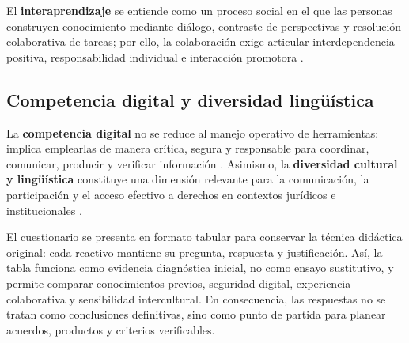 \documentclass[
  spanish,
  letterpaper, oneside
]{article}
\begin{document}
El \textbf{interaprendizaje} se entiende como un proceso social en el que las
personas construyen conocimiento mediante diálogo, contraste de perspectivas y
resolución colaborativa de tareas; por ello, la colaboración exige articular
interdependencia positiva, responsabilidad individual e interacción promotora
\citep{vygotsky1978mind,johnsonJohnson1999learning}.

\subsection{Competencia digital y diversidad lingüística}

La \textbf{competencia digital} no se reduce al manejo operativo de herramientas:
implica emplearlas de manera crítica, segura y responsable para coordinar,
comunicar, producir y verificar información \citep{unescoDigitalLiteracy2018}.
Asimismo, la \textbf{diversidad cultural y lingüística} constituye una dimensión
relevante para la comunicación, la participación y el acceso efectivo a derechos
en contextos jurídicos e institucionales \citep{cpeum2026,leyDerechosLinguisticos2024}.

El cuestionario se presenta en formato tabular para conservar la técnica didáctica
original: cada reactivo mantiene su pregunta, respuesta y justificación. Así, la
tabla funciona como evidencia diagnóstica inicial, no como ensayo sustitutivo, y
permite comparar conocimientos previos, seguridad digital, experiencia
colaborativa y sensibilidad intercultural. En consecuencia, las respuestas no se
tratan como conclusiones definitivas, sino como punto de partida para planear
acuerdos, productos y criterios verificables.
\end{document}
